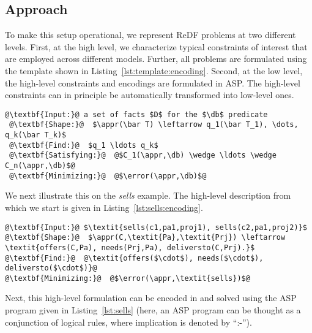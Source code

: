 \subsection{Approach}
To make this setup operational, we represent ReDF problems at two different levels. First, at the high level, we characterize typical constraints of interest that are employed across different models. Further, all problems are formulated using the template shown in Listing~\ref{lst:template:encoding}. Second, at the low level, the high-level constraints and encodings are formulated in ASP. The high-level constraints can in principle be automatically transformed into low-level ones.

\begin{lstlisting}[style=model,caption=Prototypical template of a high level problem encoding, label=lst:template:encoding]
 @\textbf{Input:}@ a set of facts $D$ for the $\db$ predicate 
 @\textbf{Shape:}@  $\appr(\bar T) \leftarrow q_1(\bar T_1), \dots, q_k(\bar T_k)$
 @\textbf{Find:}@  $q_1 \ldots q_k$
 @\textbf{Satisfying:}@  @$C_1(\appr,\db) \wedge \ldots \wedge C_n(\appr,\db)$@
 @\textbf{Minimizing:}@  @$\error(\appr,\db)$@\end{lstlisting}

We next illustrate this on the {\em sells} example. The high-level description from which we start is given in Listing~\ref{lst:sells:encoding}.

\begin{lstlisting}[style=model,caption=Sells example encoding, label=lst:sells:encoding]
@\textbf{Input:}@ $\textit{sells(c1,pa1,proj1), sells(c2,pa1,proj2)}$ 
@\textbf{Shape:}@  $\appr(C,\textit{Pa},\textit{Prj}) \leftarrow \textit{offers(C,Pa), needs(Prj,Pa), deliversto(C,Prj).}$
@\textbf{Find:}@  @\textit{offers($\cdot$), needs($\cdot$), deliversto($\cdot$)}@
@\textbf{Minimizing:}@  @$\error(\appr,\textit{sells})$@
\end{lstlisting}

Next, this high-level formulation can be encoded in and solved using the ASP program given in Listing~\ref{lst:sells} (here, an ASP program can be thought as a conjunction of logical rules, where implication is denoted by ``:-'').


